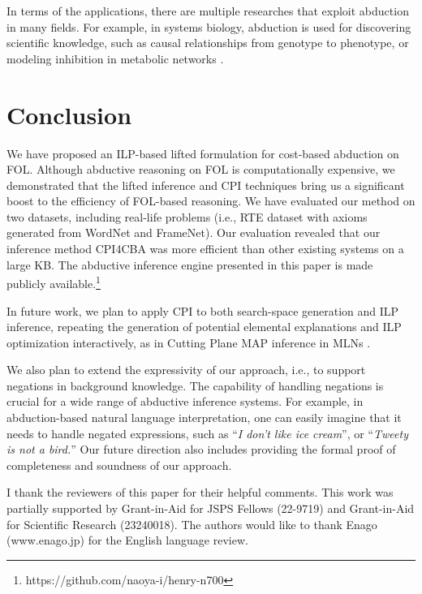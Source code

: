 \documentclass[english]{jnlp_1.4}
\begin{document}
In terms of the applications, there are multiple researches that
exploit abduction in many fields. For example, in systems biology,
abduction is used for discovering scientific knowledge, such as causal
relationships from genotype to phenotype, or modeling inhibition in
metabolic networks \cite{Doncescu08,Tamaddoni-Nezhad06}.


\section{Conclusion}

We have proposed an ILP-based lifted formulation for cost-based abduction on
FOL. 
Although abductive reasoning on FOL is computationally expensive,
we demonstrated that the lifted inference and CPI
techniques bring us a significant boost to the efficiency of
FOL-based reasoning. We have evaluated our method on two datasets, including
real-life problems (i.e., RTE dataset with axioms generated from WordNet and
FrameNet).
 Our evaluation revealed that our inference method CPI4CBA
was more efficient than other existing systems on a large KB. The
abductive inference engine presented in this paper is made publicly
available.\footnote{https://github.com/naoya-i/henry-n700}

In future work, we plan to apply CPI to both
search-space generation and ILP inference, repeating the generation of
potential elemental explanations and ILP optimization interactively,
as in Cutting Plane MAP inference in MLNs \cite{Riedel08}. 

We also plan to extend the expressivity of our approach, i.e., to
support negations in background knowledge. The capability of handling
negations is crucial for a wide range of abductive inference
systems. For example, in abduction-based natural language
interpretation, one can easily imagine that it needs to handle negated
expressions, such as ``\emph{I don't like ice cream}'', or
``\emph{Tweety is not a bird.}'' Our future direction also includes
providing the formal proof of completeness and soundness of our approach.





\acknowledgment

I thank the reviewers of this paper for their helpful comments.
This work was partially supported by Grant-in-Aid for JSPS Fellows
(22-9719) and Grant-in-Aid for Scientific Research (23240018). 
The authors would like to thank Enago (www.enago.jp) for the English language
review.
\end{document}
